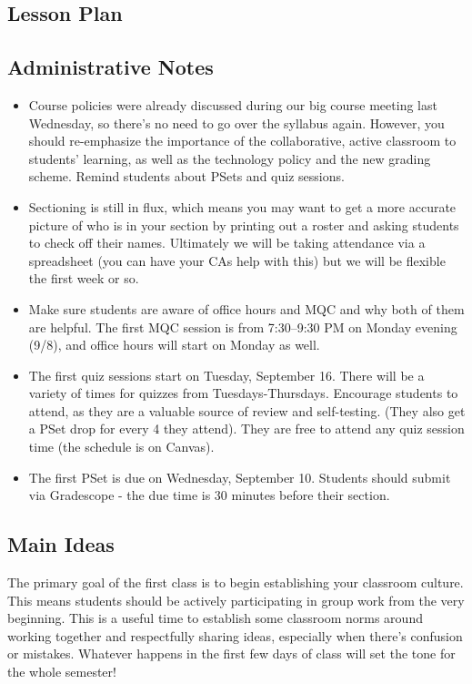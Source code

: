 \documentclass[10pt]{article}
\begin{document}
\begin{plan}
    \section{Lesson Plan}
    \vspace*{-4ex}
    
    \subsection{Administrative Notes}
    \begin{itemize}
        \item Course policies were already discussed during our big course meeting last Wednesday, so there's no need to go over the syllabus again. However, you should re-emphasize the importance of the collaborative, active classroom to students' learning, as well as the technology policy and the new grading scheme. Remind students about PSets and quiz sessions.
        \item Sectioning is still in flux, which means you may want to get a more accurate picture of who is in your section by printing out a roster and asking students to check off their names. Ultimately we will be taking attendance via a spreadsheet (you can have your CAs help with this) but we will be flexible the first week or so. 
        \item Make sure students are aware of office hours and MQC and why both of them are helpful. The first MQC session is from 7:30--9:30 PM on Monday evening (9/8), and office hours will start on Monday as well. 
        \item The first quiz sessions start on Tuesday, September 16. There will be a variety of times for quizzes from Tuesdays-Thursdays. Encourage students to attend, as they are a valuable source of review and self-testing. (They also get a PSet drop for every 4 they attend). They are free to attend any quiz session time (the schedule is on Canvas).
        \item The first PSet is due on Wednesday, September 10. Students should submit via Gradescope - the due time is 30 minutes before their section.
    \end{itemize}
    
    \subsection{Main Ideas}
    The primary goal of the first class is to begin establishing your classroom culture. This means students should be actively participating in group work from the very beginning. This is a useful time to establish some classroom norms around working together and respectfully sharing ideas, especially when there's confusion or mistakes. Whatever happens in the first few days of class will set the tone for the whole semester!
    

\end{plan}
\end{document}
